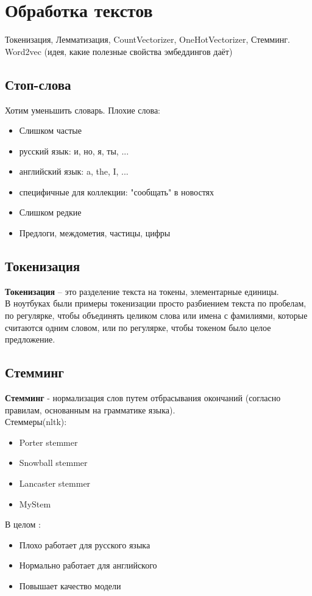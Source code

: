 \section{Обработка текстов}
Токенизация, Лемматизация, CountVectorizer, OneHotVectorizer, Стемминг. Word2vec (идея, какие полезные свойства эмбеддингов даёт)

\subsection{Стоп-слова}
Хотим уменьшить словарь.
Плохие слова:
\begin {itemize}
    \item Слишком частые
    \item русский язык: и, но, я, ты, ...
    \item английский язык: a, the, I, ...
    \item специфичные для коллекции: "сообщать" в новостях
    \item Слишком редкие
    \item Предлоги, междометия, частицы, цифры
\end {itemize}

\subsection{Токенизация}
\textbf{Токенизация} -- это разделение текста на токены, элементарные единицы. 
\\
В ноутбуках были примеры токенизации просто разбиением текста по пробелам, по регулярке, чтобы объединять целиком слова или имена с фамилиями, которые считаются одним словом, или по регулярке, чтобы токеном было целое предложение.

\subsection{Стемминг}
\textbf{Стемминг} - нормализация слов путем отбрасывания окончаний (согласно правилам, основанным на грамматике языка).
\\
Стеммеры(nltk):
\begin{itemize}
    \item Porter stemmer
    \item Snowball stemmer
    \item Lancaster stemmer
    \item MyStem
\end{itemize}

В целом :
\begin{itemize}
    \item Плохо работает для русского языка
    \item Нормально работает для английского
    \item Повышает качество модели
\end{itemize}

